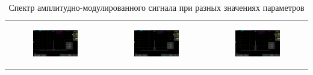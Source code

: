 \documentclass[a4paper,12pt]{article} %
\begin{document}
\begin{table}[ht]
\begin{tabular}{ccc}
\newline
\begin{subfigure}{0.3\textwidth}\centering\includegraphics[width=\columnwidth]{III/AKIP0025.png}\end{subfigure} &
\begin{subfigure}{0.3\textwidth}\centering\includegraphics[width=\columnwidth]{III/AKIP0026.png}\end{subfigure} &
\begin{subfigure}{0.3\textwidth}\centering\includegraphics[width=\columnwidth]{III/AKIP0027.png}\end{subfigure} \\
\end{tabular}
\caption{Спектр амплитудно-модулированного сигнала при разных значениях параметров}
\label{tab:picsIII}
\end{table}
\end{document}
